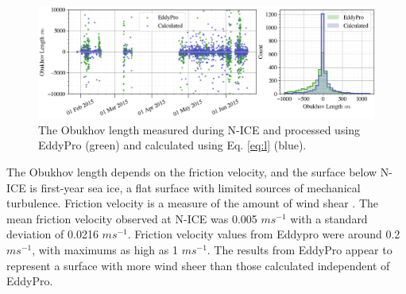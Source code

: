 \begin{figure}[H]
    \centering
    \includegraphics[width=1\linewidth]{figures/chapter5/ch3_obukhovlength.png}
    \caption[Obukhov length]{The Obukhov length measured during N-ICE and processed using EddyPro (green) and calculated using Eq. \ref{eq:l} (blue).}
    \label{fig:ol}
\end{figure}

The Obukhov length depends on the friction velocity, and the surface below N-ICE is first-year sea ice, a flat surface with limited sources of mechanical turbulence. Friction velocity is a measure of the amount of wind shear \citep{stull:1988}. The mean friction velocity observed at N-ICE was 0.005 $m s^{-1}$ with a standard deviation of 0.0216 $m s^{-1}$. Friction velocity values from Eddypro were around 0.2 $m s^{-1}$, with maximums as high as 1 $m s^{-1}$. The results from EddyPro appear to represent a surface with more wind sheer than those calculated independent of EddyPro. 


